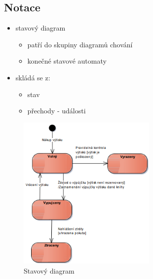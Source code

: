 \documentclass{szzclass}
\begin{document}
\subsection{Notace}
\begin{itemize}
    \item stavový diagram
    \begin{itemize}
        \item patří do skupiny diagramů chování
        \item konečné stavové automaty
    \end{itemize}
    \item skládá se z:
    \begin{itemize}
        \item stav
        \item přechody - události
    \end{itemize}
\end{itemize}
\begin{figure}[h!]
    \centering
    \includegraphics[width=0.6\textwidth]{topics/bi-spol-31/images/entityState.png}
    \caption{Stavový diagram}
\end{figure}
\end{document}
